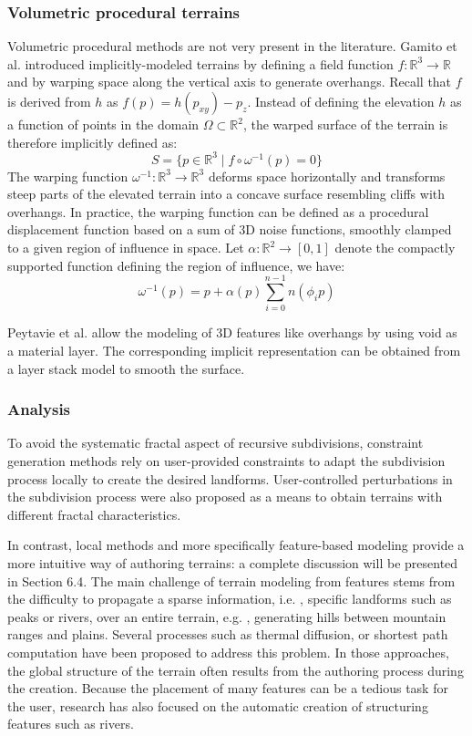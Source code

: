 \documentclass{article}
\begin{document}
\subsubsection{Volumetric procedural terrains}

Volumetric procedural methods are not very present in the literature. Gamito et al. \cite{GM01} introduced implicitly-modeled terrains by defining a field function $f : \mathbb{R}^3 \to \mathbb{R}$ and by warping space along the vertical axis to generate overhangs. Recall that $f$ is derived from $h$ as $f(p) = h(p_{xy}) - p_z$. Instead of defining the elevation $h$ as a function of points in the domain $\Omega \subset \mathbb{R}^2$, the warped surface of the terrain is therefore implicitly defined as:
\[
S = \{p \in \mathbb{R}^3 \mid f \circ \omega^{-1}(p) = 0\}
\]
The warping function $\omega^{-1} : \mathbb{R}^3 \to \mathbb{R}^3$ deforms space horizontally and transforms steep parts of the elevated terrain into a concave surface resembling cliffs with overhangs. In practice, the warping function can be defined as a procedural displacement function based on a sum of 3D noise functions, smoothly clamped to a given region of influence in space. Let $\alpha : \mathbb{R}^2 \to [0,1]$ denote the compactly supported function defining the region of influence, we have:
\[
\omega^{-1}(p) = p + \alpha(p) \sum_{i=0}^{n-1} n(\phi_i p)
\]

Peytavie et al. \cite{PGMG09a} allow the modeling of 3D features like overhangs by using void as a material layer. The corresponding implicit representation can be obtained from a layer stack model to smooth the surface.

\subsubsection{Analysis}

To avoid the systematic fractal aspect of recursive subdivisions, constraint generation methods rely on user-provided constraints to adapt the subdivision process locally to create the desired landforms. User-controlled perturbations in the subdivision process were also proposed as a means to obtain terrains with different fractal characteristics.

In contrast, local methods and more specifically feature-based modeling provide a more intuitive way of authoring terrains: a complete discussion will be presented in Section 6.4. The main challenge of terrain modeling from features stems from the difficulty to propagate a sparse information, i.e. , specific landforms such as peaks or rivers, over an entire terrain, e.g. , generating hills between mountain ranges and plains. Several processes such as thermal diffusion, or shortest path computation have been proposed to address this problem. In those approaches, the global structure of the terrain often results from the authoring process during the creation. Because the placement of many features can be a tedious task for the user, research has also focused on the automatic creation of structuring features such as rivers.
\end{document}
